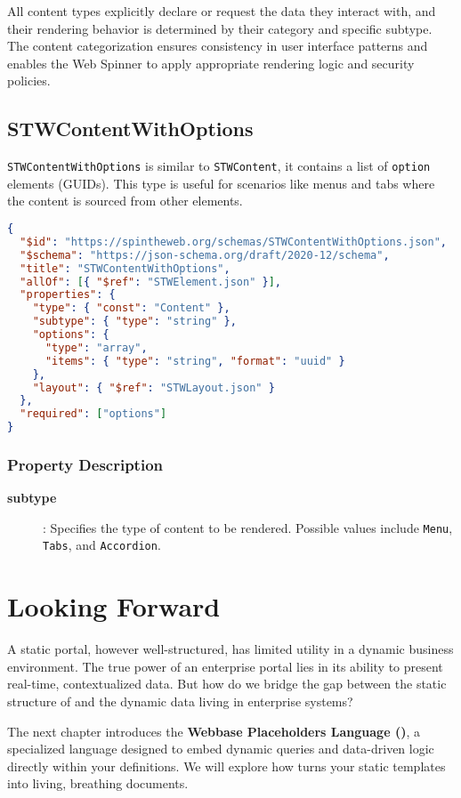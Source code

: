 All content types explicitly declare or request the data they interact with, and their rendering behavior is determined by their category and specific subtype. The content categorization ensures consistency in user interface patterns and enables the Web Spinner to apply appropriate rendering logic and security policies.

\subsection{STWContentWithOptions}

	\texttt{STWContentWithOptions} is similar to \texttt{STWContent}, it contains a list of \texttt{option} elements (GUIDs). This type is useful for scenarios like menus and tabs where the content is sourced from other elements.

\begin{lstlisting}[language=JSON,caption={STWContentWithOptions Schema Definition}]
{
  "$id": "https://spintheweb.org/schemas/STWContentWithOptions.json",
  "$schema": "https://json-schema.org/draft/2020-12/schema",
  "title": "STWContentWithOptions",
  "allOf": [{ "$ref": "STWElement.json" }],
  "properties": {
    "type": { "const": "Content" },
    "subtype": { "type": "string" },
    "options": {
      "type": "array",
      "items": { "type": "string", "format": "uuid" }
    },
    "layout": { "$ref": "STWLayout.json" }
  },
  "required": ["options"]
}
\end{lstlisting}

\subsubsection{Property Description}

\begin{description}
\item[\textbf{subtype}]: Specifies the type of content to be rendered. Possible values include \texttt{Menu}, \texttt{Tabs}, and \texttt{Accordion}.
\end{description}

\section{Looking Forward}
\label{sec:wbdl-forward}

A static portal, however well-structured, has limited utility in a dynamic business environment. The true power of an enterprise portal lies in its ability to present real-time, contextualized data. But how do we bridge the gap between the static structure of \wbdl{} and the dynamic data living in enterprise systems?

The next chapter introduces the \textbf{Webbase Placeholders Language (\wbpl{})}, a specialized language designed to embed dynamic queries and data-driven logic directly within your \wbdl{} definitions. We will explore how \wbpl{} turns your static templates into living, breathing documents.

